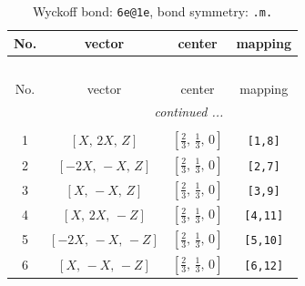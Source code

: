 \documentclass[fleqn,8pt]{jsarticle}
\begin{document}
\renewcommand{\arraystretch}{1.2}
\begin{longtable}{cccc}
\caption{Wyckoff bond: {\tt 6e@1e}, bond symmetry: {\tt .m.}}
 \\
 \hline \hline
No. & vector & center & mapping \\ \hline \endfirsthead

\multicolumn{3}{l}{\tablename\ \thetable{}} \\
 \hline \hline
No. & vector & center & mapping \\ \hline \endhead

 \hline \hline
\multicolumn{3}{r}{\footnotesize\it continued ...} \\ \endfoot

 \hline \hline
\multicolumn{3}{r}{} \\ \endlastfoot

1 & $\left[ X,\, 2 X,\, Z \right]$ & $\left[ \frac{2}{3},\, \frac{1}{3},\, 0 \right]$ & {\tt [1,8]} \\ \hline
2 & $\left[ - 2 X,\, - X,\, Z \right]$ & $\left[ \frac{2}{3},\, \frac{1}{3},\, 0 \right]$ & {\tt [2,7]} \\ \hline
3 & $\left[ X,\, - X,\, Z \right]$ & $\left[ \frac{2}{3},\, \frac{1}{3},\, 0 \right]$ & {\tt [3,9]} \\ \hline
4 & $\left[ X,\, 2 X,\, - Z \right]$ & $\left[ \frac{2}{3},\, \frac{1}{3},\, 0 \right]$ & {\tt [4,11]} \\ \hline
5 & $\left[ - 2 X,\, - X,\, - Z \right]$ & $\left[ \frac{2}{3},\, \frac{1}{3},\, 0 \right]$ & {\tt [5,10]} \\ \hline
6 & $\left[ X,\, - X,\, - Z \right]$ & $\left[ \frac{2}{3},\, \frac{1}{3},\, 0 \right]$ & {\tt [6,12]} \\
\end{longtable}
\renewcommand{\arraystretch}{1.2}
\end{document}
